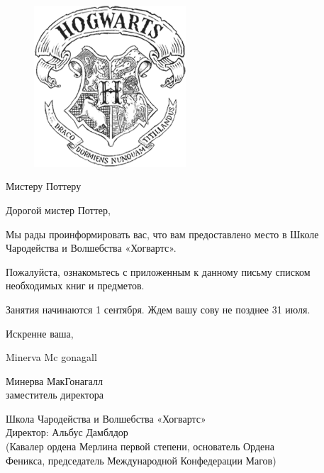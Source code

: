 \documentclass[14pt, a4paper]{article}
\begin{document}
\thispagestyle{empty}

\begin{figure}[H]
\begin{center}
\includegraphics[height=6cm]{hogwarts.png}
\end{center}
\end{figure}

\vspace{1cm}

{\fontsize{12}{1}\selectfont Мистеру Поттеру}

\vspace{2.5cm}

Дорогой мистер Поттер,

Мы рады проинформировать вас, что вам предоставлено место в Школе Чародейства и Волшебства «Хогвартс».

Пожалуйста, ознакомьтесь с приложенным к данному письму списком необходимых книг и предметов.

Занятия начинаются 1 сентября. Ждем вашу сову не позднее 31 июля.


\vfill

Искренне ваша,

{ \fontsize{26}{1}\selectfont \hspace{3mm} Minerva Mc gonagall }

Минерва МакГонагалл \\
заместитель директора

\vspace{10mm}

\begin{center}
Школа Чародейства и Волшебства «Хогвартс» \\
\vspace{2mm}
\small Директор: Альбус Дамблдор \\
(Кавалер ордена Мерлина первой степени, основатель Ордена \\ Феникса, председатель Международной Конфедерации Магов)
\end{center} 
\end{document}
